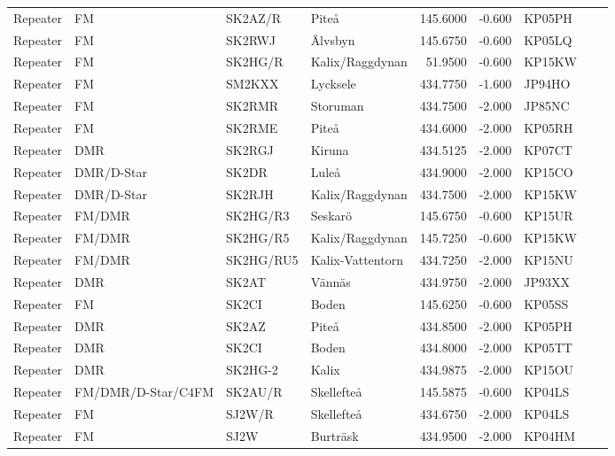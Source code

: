 \begin{longtable}{llllrrlcl}
	Repeater & FM                 & SK2AZ/R   & Piteå                   &   145.6000 &  -0.600 & KP05PH &  &  \\
	Repeater & FM                 & SK2RWJ    & Älvsbyn                 &   145.6750 &  -0.600 & KP05LQ &  &  \\
	Repeater & FM                 & SK2HG/R   & Kalix/Raggdynan         &    51.9500 &  -0.600 & KP15KW &  &  \\
	Repeater & FM                 & SM2KXX    & Lycksele                &   434.7750 &  -1.600 & JP94HO &  &  \\
	Repeater & FM                 & SK2RMR    & Storuman                &   434.7500 &  -2.000 & JP85NC &  &  \\
	Repeater & FM                 & SK2RME    & Piteå                   &   434.6000 &  -2.000 & KP05RH &  &  \\
	Repeater & DMR                & SK2RGJ    & Kiruna                  &   434.5125 &  -2.000 & KP07CT &  &  \\
	Repeater & DMR/D-Star         & SK2DR     & Luleå                   &   434.9000 &  -2.000 & KP15CO &  &  \\
	Repeater & DMR/D-Star         & SK2RJH    & Kalix/Raggdynan         &   434.7500 &  -2.000 & KP15KW &  &  \\
	Repeater & FM/DMR             & SK2HG/R3  & Seskarö                 &   145.6750 &  -0.600 & KP15UR &  &  \\
	Repeater & FM/DMR             & SK2HG/R5  & Kalix/Raggdynan         &   145.7250 &  -0.600 & KP15KW &  &  \\
	Repeater & FM/DMR             & SK2HG/RU5 & Kalix-Vattentorn        &   434.7250 &  -2.000 & KP15NU &  &  \\
	Repeater & DMR                & SK2AT     & Vännäs                  &   434.9750 &  -2.000 & JP93XX &  &  \\
	Repeater & FM                 & SK2CI     & Boden                   &   145.6250 &  -0.600 & KP05SS &  &  \\
	Repeater & DMR                & SK2AZ     & Piteå                   &   434.8500 &  -2.000 & KP05PH &  &  \\
	Repeater & DMR                & SK2CI     & Boden                   &   434.8000 &  -2.000 & KP05TT &  &  \\
	Repeater & DMR                & SK2HG-2   & Kalix                   &   434.9875 &  -2.000 & KP15OU &  &  \\
	Repeater & FM/DMR/D-Star/C4FM & SK2AU/R   & Skellefteå              &   145.5875 &  -0.600 & KP04LS &  &  \\
	Repeater & FM                 & SJ2W/R    & Skellefteå              &   434.6750 &  -2.000 & KP04LS &  &  \\
	Repeater & FM                 & SJ2W      & Burträsk                &   434.9500 &  -2.000 & KP04HM &  &
\end{longtable}

